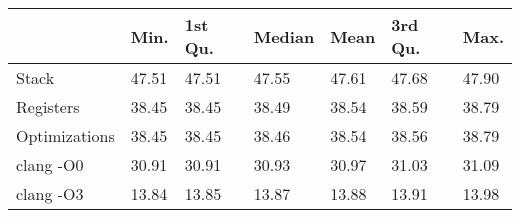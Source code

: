 \begin{table}[ht]
\centering
\begin{tabular}{p{}p{}p{}p{}p{}p{}p{}}
  \hline
 & Min. & 1st Qu. & Median & Mean & 3rd Qu. & Max. \\ 
  \hline
Stack & 47.51 & 47.51 & 47.55 & 47.61 & 47.68 & 47.90 \\ 
  Registers & 38.45 & 38.45 & 38.49 & 38.54 & 38.59 & 38.79 \\ 
  Optimizations & 38.45 & 38.45 & 38.46 & 38.54 & 38.56 & 38.79 \\ 
  clang -O0 & 30.91 & 30.91 & 30.93 & 30.97 & 31.03 & 31.09 \\ 
  clang -O3 & 13.84 & 13.85 & 13.87 & 13.88 & 13.91 & 13.98 \\ 
   \hline
\end{tabular}
\end{table}
